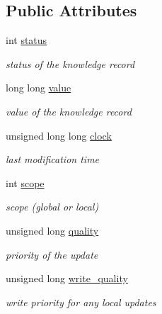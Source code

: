 \subsection*{Public Attributes}
\begin{DoxyCompactItemize}
\item 
int \hyperlink{classMadara_1_1Knowledge__Record_a733d1b9ef2803c4767b1d5e13e0fd51d}{status}
\begin{DoxyCompactList}\small\item\em status of the knowledge record \item\end{DoxyCompactList}\item 
long long \hyperlink{classMadara_1_1Knowledge__Record_a073d8b21a172cea83d0e10355e9f4929}{value}
\begin{DoxyCompactList}\small\item\em value of the knowledge record \item\end{DoxyCompactList}\item 
unsigned long long \hyperlink{classMadara_1_1Knowledge__Record_aca8e7f63c349e5790602209fb8db2c51}{clock}
\begin{DoxyCompactList}\small\item\em last modification time \item\end{DoxyCompactList}\item 
int \hyperlink{classMadara_1_1Knowledge__Record_a54aec9af28fc19d82a92097b2acd8cf8}{scope}
\begin{DoxyCompactList}\small\item\em scope (global or local) \item\end{DoxyCompactList}\item 
unsigned long \hyperlink{classMadara_1_1Knowledge__Record_ad106dacb16a7a9f4e4a3e68ac04a41d2}{quality}
\begin{DoxyCompactList}\small\item\em priority of the update \item\end{DoxyCompactList}\item 
unsigned long \hyperlink{classMadara_1_1Knowledge__Record_a25f274b4cb90a66c8d08eb6aebedd954}{write\_\-quality}
\begin{DoxyCompactList}\small\item\em write priority for any local updates \item\end{DoxyCompactList}\end{DoxyCompactItemize}


